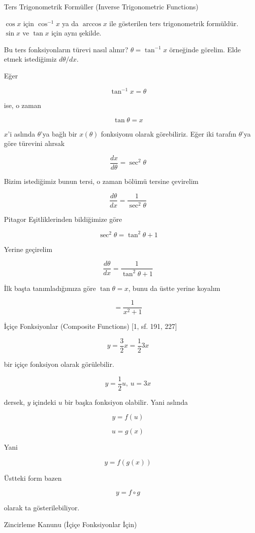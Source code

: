 \documentclass[12pt,fleqn]{article}\usepackage{../../common}
\begin{document}
Ters Trigonometrik Formüller (Inverse Trigonometric Functions)

$\cos x$ için $\cos^{-1} x$ ya da $\arccos x$ ile gösterilen ters
trigonometrik formüldür. $\sin x$ ve $\tan x$ için aynı şekilde. 

Bu ters fonksiyonların türevi nasıl alınır? $\theta = \tan^{-1}x$ örneğinde
görelim. Elde etmek istediğimiz $d\theta/dx$. 

Eğer

$$ \tan^{-1}x = \theta$$

ise, o zaman 

$$ \tan\theta = x $$

$x$'i aslında $\theta$'ya bağlı bir $x(\theta)$ fonksiyonu olarak görebiliriz. 
Eğer iki tarafın $\theta$'ya göre türevini alırsak

$$ \frac{dx}{d\theta} = \sec^{2}\theta $$

Bizim istediğimiz bunun tersi, o zaman bölümü tersine çevirelim

$$ \frac{d\theta}{dx} = \frac{1}{\sec^{2}\theta} $$

Pitagor Eşitliklerinden bildiğimize göre

$$ \sec^{2}\theta = \tan^{2}\theta + 1 $$

Yerine geçirelim

$$ \frac{d\theta}{dx} = \frac{1}{\tan^{2}\theta + 1} $$

İlk başta tanımladığımıza göre $\tan\theta = x$, bunu da üstte yerine
koyalım

$$  = \frac{1}{x^2 + 1} $$

\newpage

İçiçe Fonksiyonlar (Composite Functions) [1, sf. 191, 227]

$$ y = \frac{3}{2}x = \frac{1}{2}3x $$

bir içiçe fonksiyon olarak görülebilir. 

$$ y = \frac{1}{2}u, \ u=3x $$

dersek, $y$ içindeki $u$ bir başka fonksiyon olabilir. Yani aslında 

$$ y = f(u) $$

$$ u = g(x) $$

Yani

$$ y = f(g(x)) $$

Üstteki form bazen 

$$ y = f \circ g $$

olarak ta gösterilebiliyor. 

\newpage

Zincirleme Kanunu (İçiçe Fonksiyonlar İçin)
\end{document}
